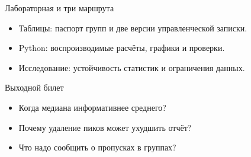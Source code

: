 \documentclass[aspectratio=169,10pt]{beamer}
\begin{document}
\begin{frame}[t]{Лабораторная и три маршрута}
\vspace{.15cm}\begin{itemize}
\item Таблицы: паспорт групп и две версии управленческой записки.\vspace{6pt}
\item Python: воспроизводимые расчёты, графики и проверки.\vspace{6pt}
\item Исследование: устойчивость статистик и ограничения данных.\vspace{6pt}
\end{itemize}
\end{frame}
\begin{frame}[t]{Выходной билет}
\vspace{.15cm}\begin{itemize}
\item Когда медиана информативнее среднего?\vspace{6pt}
\item Почему удаление пиков может ухудшить отчёт?\vspace{6pt}
\item Что надо сообщить о пропусках в группах?\vspace{6pt}
\end{itemize}
\end{frame}
\end{document}
